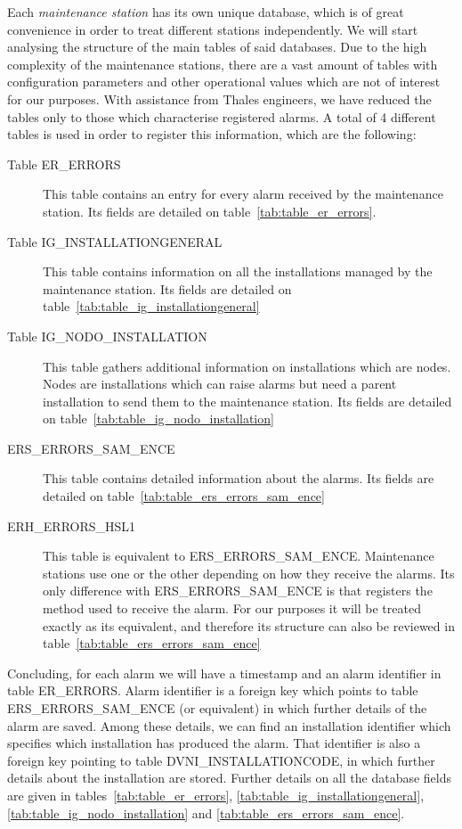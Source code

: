 Each \emph{maintenance station} has its own unique database, which is of great convenience in order to treat different stations independently. We will start analysing the structure of the main tables of said databases. Due to the high complexity of the maintenance stations, there are a vast amount of tables with configuration parameters and other operational values which are not of interest for our purposes. With assistance from Thales engineers, we have reduced the tables only to those which characterise registered alarms. A total of 4 different tables is used in order to register this information, which are the following:

\begin{description}
\item[Table ER\_ERRORS] This table contains an entry for every alarm received by the maintenance station. Its fields are detailed on table~\ref{tab:table_er_errors}.
\item[Table IG\_INSTALLATIONGENERAL] This table contains information on all the installations managed by the maintenance station. Its fields are detailed on table~\ref{tab:table_ig_installationgeneral}
\item[Table IG\_NODO\_INSTALLATION] This table gathers additional information on installations which are nodes. Nodes are installations which can raise alarms but need a parent installation to send them to the maintenance station. Its fields are detailed on table~\ref{tab:table_ig_nodo_installation}
\item[ERS\_ERRORS\_SAM\_ENCE] This table contains detailed information about the alarms. Its fields are detailed on table~\ref{tab:table_ers_errors_sam_ence}
\item[ERH\_ERRORS\_HSL1] This table is equivalent to ERS\_ERRORS\_SAM\_ENCE. Maintenance stations use one or the other depending on how they receive the alarms. Its only difference with ERS\_ERRORS\_SAM\_ENCE is that registers the method used to receive the alarm. For our purposes it will be treated exactly as its equivalent, and therefore its structure can also be reviewed in table~\ref{tab:table_ers_errors_sam_ence}
\end{description}

Concluding, for each alarm we will have a timestamp and an alarm identifier in table ER\_ERRORS. Alarm identifier is a foreign key which points to table ERS\_ERRORS\_SAM\_ENCE (or equivalent) in which further details of the alarm are saved. Among these details, we can find an installation identifier which specifies which installation has produced the alarm. That identifier is also a foreign key pointing to table DVNI\_INSTALLATIONCODE, in which further details about the installation are stored. Further details on all the database fields are given in tables~\ref{tab:table_er_errors}, \ref{tab:table_ig_installationgeneral}, \ref{tab:table_ig_nodo_installation} and \ref{tab:table_ers_errors_sam_ence}.


